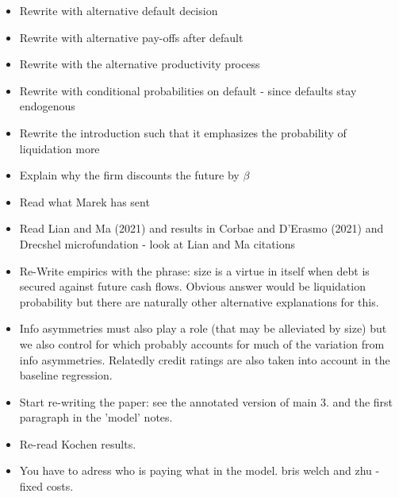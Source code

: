 \documentclass[12pt]{article}
\begin{document}
\begin{itemize}
    \item Rewrite with alternative default decision  \checkmark
    \item Rewrite with alternative pay-offs after default  \checkmark
    \item Rewrite with the alternative productivity process  \checkmark
    \item Rewrite with conditional probabilities on default - since defaults stay endogenous  \checkmark
    \item Rewrite the introduction  such that it emphasizes the probability of liquidation more
    \item Explain why the firm discounts the future by $\beta$ \checkmark
    \item Read what Marek has sent 
    \item Read Lian and Ma (2021) and results in Corbae and D'Erasmo (2021) and Drecshel microfundation  - look at Lian and Ma citations
    \item Re-Write empirics with the phrase: size is a virtue in itself when debt is secured against future cash flows. Obvious answer would be liquidation probability but there are naturally other alternative explanations for this. \checkmark
    \item Info asymmetries must also play a role (that may be alleviated by size) but we also control for which probably accounts for much of the variation from info asymmetries. Relatedly credit ratings are also taken into account in the baseline regression. \checkmark
    \item Start re-writing the paper: see the annotated version of main 3. and the first paragraph in the 'model' notes. \checkmark
    \item Re-read Kochen results. \checkmark
    \item You have to adress who is paying what in the model. bris welch and zhu - fixed costs. 
\newpage

\end{itemize} \normalsize
\end{document}
